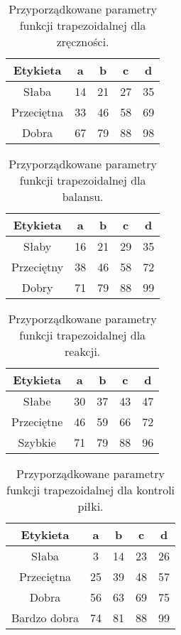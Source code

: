 \documentclass{classrep}
\begin{document}
\begin{table}[H]
	\centering
	\begin{tabular}{c c c c c} 
		\hline
		\textbf{Etykieta} & \textbf{a} & \textbf{b} & \textbf{c} &  \textbf{d} \\ [0.5ex] 
		\hline
		\hline 
		Słaba & 14 & 21 & 27 & 35 \\ 
		Przeciętna & 33 & 46 & 58 & 69 \\
		Dobra & 67 & 79 & 88 & 98 \\
		\hline
	\end{tabular}
	\caption{Przyporządkowane parametry funkcji trapezoidalnej dla zręczności.}
\end{table}

\begin{table}[H]
	\centering
	\begin{tabular}{c c c c c} 
		\hline
		\textbf{Etykieta} & \textbf{a} & \textbf{b} & \textbf{c} &  \textbf{d} \\ [0.5ex] 
		\hline
		\hline 
		Słaby & 16 & 21 & 29 & 35 \\ 
		Przeciętny & 38 & 46 & 58 & 72 \\
		Dobry & 71 & 79 & 88 & 99 \\
		\hline
	\end{tabular}
	\caption{Przyporządkowane parametry funkcji trapezoidalnej dla balansu.}
\end{table}

\begin{table}[H]
	\centering
	\begin{tabular}{c c c c c} 
		\hline
		\textbf{Etykieta} & \textbf{a} & \textbf{b} & \textbf{c} &  \textbf{d} \\ [0.5ex] 
		\hline
		\hline 
		Słabe & 30 & 37 & 43 & 47 \\ 
		Przeciętne & 46 & 59 & 66 & 72 \\
		Szybkie & 71 & 79 & 88 & 96 \\
		\hline
	\end{tabular}
	\caption{Przyporządkowane parametry funkcji trapezoidalnej dla reakcji.}
\end{table}

\begin{table}[H]
	\centering
	\begin{tabular}{c c c c c} 
		\hline
		\textbf{Etykieta} & \textbf{a} & \textbf{b} & \textbf{c} &  \textbf{d} \\ [0.5ex] 
		\hline
		\hline 
		Słaba & 3 & 14 & 23 & 26 \\ 
		Przeciętna & 25 & 39 & 48 & 57 \\
		Dobra & 56 & 63 & 69 & 75 \\
		Bardzo dobra & 74 & 81 & 88 & 99 \\
		\hline
	\end{tabular}
	\caption{Przyporządkowane parametry funkcji trapezoidalnej dla kontroli piłki.}
\end{table}
\end{document}

